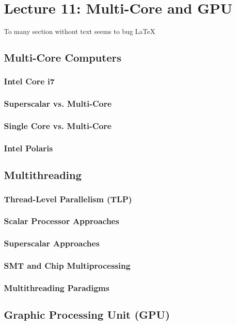 \section{Lecture 11: Multi-Core and GPU}
To many section without text seems to bug \LaTeX
\subsection{Multi-Core Computers}
\subsubsection{Intel Core i7}
\subsubsection{Superscalar vs. Multi-Core}
\subsubsection{Single Core vs. Multi-Core}
\subsubsection{Intel Polaris}
\subsection{Multithreading}
\subsubsection{Thread-Level Parallelism (TLP)}
\subsubsection{Scalar Processor Approaches}
\subsubsection{Superscalar Approaches}
\subsubsection{SMT and Chip Multiprocessing}
\subsubsection{Multithreading Paradigms}
\subsection{Graphic Processing Unit (GPU)}
